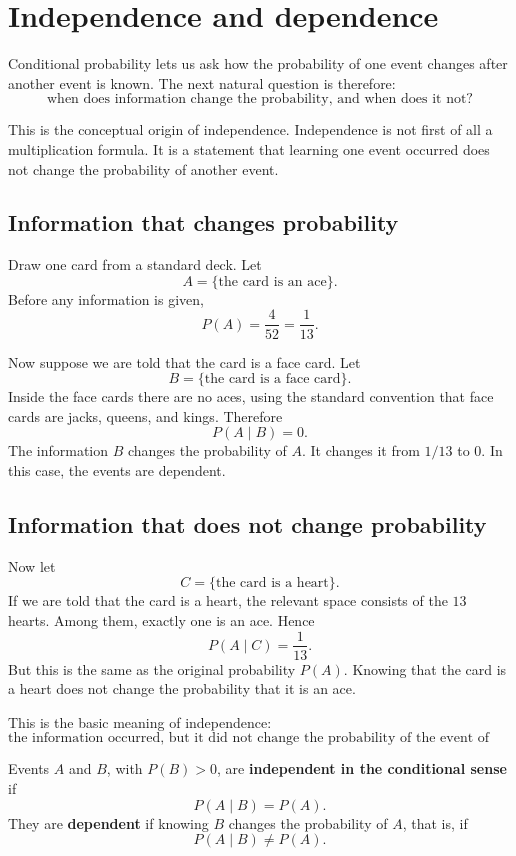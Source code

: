 \section{Independence and dependence}

Conditional probability lets us ask how the probability of one event changes
after another event is known. The next natural question is therefore:
\[
\text{when does information change the probability, and when does it not?}
\]

This is the conceptual origin of independence. Independence is not first of all
a multiplication formula. It is a statement that learning one event occurred
does not change the probability of another event.

\subsection*{Information that changes probability}

Draw one card from a standard deck. Let
\[
A=\{\text{the card is an ace}\}.
\]
Before any information is given,
\[
P(A)=\frac4{52}=\frac1{13}.
\]

Now suppose we are told that the card is a face card. Let
\[
B=\{\text{the card is a face card}\}.
\]
Inside the face cards there are no aces, using the standard convention that face
cards are jacks, queens, and kings. Therefore
\[
P(A\mid B)=0.
\]
The information \(B\) changes the probability of \(A\). It changes it from
\(1/13\) to \(0\). In this case, the events are dependent.

\subsection*{Information that does not change probability}

Now let
\[
C=\{\text{the card is a heart}\}.
\]
If we are told that the card is a heart, the relevant space consists of the
\(13\) hearts. Among them, exactly one is an ace. Hence
\[
P(A\mid C)=\frac1{13}.
\]
But this is the same as the original probability \(P(A)\). Knowing that the card
is a heart does not change the probability that it is an ace.

This is the basic meaning of independence:
\[
\text{the information occurred, but it did not change the probability of the event of interest.}
\]

\begin{definitionbox}
Events \(A\) and \(B\), with \(P(B)>0\), are \textbf{independent in the
conditional sense} if
\[
P(A\mid B)=P(A).
\]
They are \textbf{dependent} if knowing \(B\) changes the probability of \(A\),
that is, if
\[
P(A\mid B)\neq P(A).
\]
\end{definitionbox}

